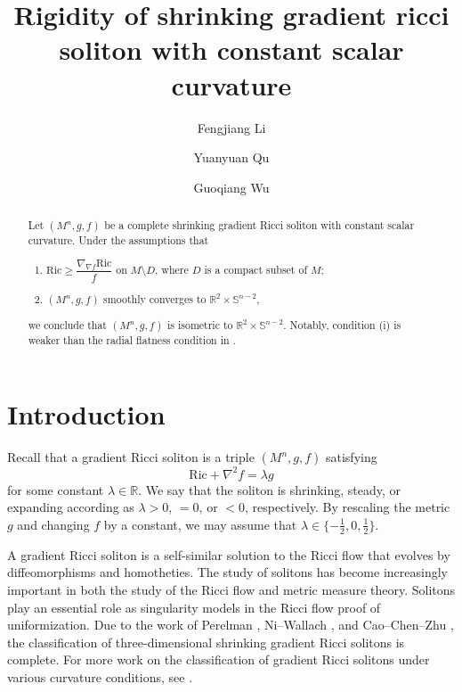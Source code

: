 \documentclass[a4, 12pt]{amsart}
\title[Shrinking gradient Ricci soliton]{Rigidity  of shrinking gradient ricci soliton with constant scalar curvature}
\author{Fengjiang Li}
\author{Yuanyuan Qu}
\author{Guoqiang Wu}
\theoremstyle{plain}
\newcommand{\Ric}{\mathrm{Ric}}
\begin{document}
\maketitle

\begin{abstract}
Let $(M^n, g, f)$ be a complete shrinking gradient Ricci soliton with constant scalar curvature. Under the assumptions that
	\begin{enumerate}
	\item[(i)] $\Ric \geq \dfrac{\nabla_{\nabla f}\Ric}{f}$ on $M \setminus D$, where $D$ is a compact subset of $M$;
	\item[(ii)] $(M^n, g, f)$ smoothly converges to $\mathbb{R}^2 \times \mathbb{S}^{n-2}$,
\end{enumerate}
we conclude that $(M^n, g, f)$ is isometric to $\mathbb{R}^2 \times \mathbb{S}^{n-2}$. Notably, condition \textup{(i)} is weaker than the radial flatness condition in \cite{Petersen-Wylie2}.
\end{abstract}
\maketitle

\section{Introduction}
Recall that a gradient Ricci soliton is a triple $(M^n, g, f)$ satisfying
\begin{equation}\label{1.1}
	\Ric + \nabla^2 f = \lambda g
\end{equation}
for some constant $\lambda \in \mathbb{R}$. We say that the soliton is shrinking, steady, or expanding according as $\lambda > 0$, $= 0$, or $< 0$, respectively. By rescaling the metric $g$ and changing $f$ by a constant, we may assume that $\lambda \in \{-\frac{1}{2}, 0, \frac{1}{2}\}$.

A gradient Ricci soliton is a self-similar solution to the Ricci flow that evolves by diffeomorphisms and homotheties. The study of solitons has become increasingly important in both the study of the Ricci flow and metric measure theory. Solitons play an essential role as singularity models in the Ricci flow proof of uniformization. Due to the work of Perelman \cite{Perelman2}, Ni--Wallach \cite{Ni-Wallach}, and Cao--Chen--Zhu \cite{Cao-Chen-Zhu}, the classification of three-dimensional shrinking gradient Ricci solitons is complete. For more work on the classification of gradient Ricci solitons under various curvature conditions, see \cite{Brendle1, Cao-Chen, Cao-Chen-Zhu, Cao-Chen2, Cao-Wang-Zhang, Chen-Wang, Eminenti-LaNave-Mantegazza, Kotschwar, Naber, Petersen-Wylie, Pigola-Rimoldi-Setti, Wu-Wu-Wylie, Zhang}.
\end{document}
